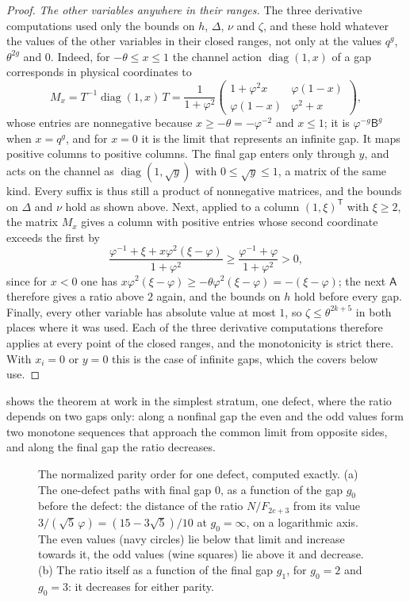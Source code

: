 \begin{proof}
\emph{The other variables anywhere in their ranges.} The three derivative
computations used only the bounds on $h$, $\Delta$, $\nu$ and $\zeta$, and these
hold whatever the values of the other variables in their closed ranges, not
only at the values $q^{g}$, $\theta^{2g}$ and $0$. Indeed, for
$-\theta\leqslant x\leqslant1$ the channel action $\operatorname{diag}(1,x)$ of a gap
corresponds in physical coordinates to
$$
 M_x=T^{-1}\operatorname{diag}(1,x)\,T=\frac1{1+\varphi^2}
 \begin{pmatrix}1+\varphi^2x&\varphi(1-x)\\\varphi(1-x)&\varphi^2+x\end{pmatrix},
$$
whose entries are nonnegative because $x\geqslant-\theta=-\varphi^{-2}$ and
$x\leqslant1$; it is $\varphi^{-g}\mathsf B^g$ when $x=q^g$, and for $x=0$ it is the
limit that represents an infinite gap. It maps positive columns to positive
columns. The final gap enters only through $y$, and acts on the channel as
$\operatorname{diag}(1,\sqrt y)$ with $0\leqslant\sqrt y\leqslant1$, a matrix of the same
kind. Every suffix is thus still a product of nonnegative matrices, and the
bounds on $\Delta$ and $\nu$ hold as shown above. Next, applied to a column
$(1,\xi)^{\mathsf T}$ with $\xi\geqslant2$, the matrix $M_x$ gives a column with
positive entries whose second coordinate exceeds the first by
$$
 \frac{\varphi^{-1}+\xi+x\varphi^2(\xi-\varphi)}{1+\varphi^2}
 \geqslant\frac{\varphi^{-1}+\varphi}{1+\varphi^2}>0 ,
$$
since for $x<0$ one has $x\varphi^2(\xi-\varphi)\geqslant-\theta\varphi^2(\xi-\varphi)=-(\xi-\varphi)$;
the next $\mathsf A$ therefore gives a ratio above $2$ again, and the bounds on
$h$ hold before every gap. Finally, every other variable has absolute value at
most $1$, so $\zeta\leqslant\theta^{2k+5}$ in both places where it was used. Each of
the three derivative computations therefore applies at every point of the
closed ranges, and the monotonicity is strict there. With $x_i=0$ or $y=0$
this is the case of infinite gaps, which the covers below use.
\end{proof}

 shows the theorem at work in the simplest stratum,
one defect, where the ratio depends on two gaps only: along a nonfinal gap the
even and the odd values form two monotone sequences that approach the common
limit from opposite sides, and along the final gap the ratio decreases.

\begin{figure}[tb]
\centering

\caption{The normalized parity order for one defect, computed exactly. (a)
The one-defect paths with final gap $0$, as a function of the gap $g_0$ before
the defect: the distance of the ratio $N/F_{2c+3}$ from its value
$3/(\sqrt5\,\varphi)=(15-3\sqrt5)/10$ at $g_0=\infty$, on a logarithmic axis.
The even values (navy circles) lie below that limit and increase towards it,
the odd values (wine squares) lie above it and decrease. (b) The ratio itself
as a function of the final gap $g_1$, for $g_0=2$ and $g_0=3$: it decreases
for either parity.}
\label{fig:parity-order}
\end{figure}


